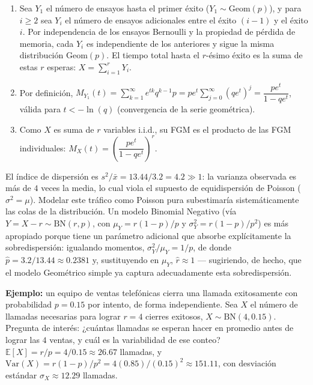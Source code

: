 \begin{solproblema}[prob:a4a72f3]
	\begin{enumerate}
		\item Sea $Y_1$ el número de ensayos hasta el primer éxito ($Y_1\sim\text{Geom}(p)$), y para $i\ge2$ sea $Y_i$ el número de ensayos adicionales entre el éxito $(i-1)$ y el éxito $i$. Por independencia de los ensayos Bernoulli y la propiedad de pérdida de memoria, cada $Y_i$ es independiente de los anteriores y sigue la misma distribución $\text{Geom}(p)$. El tiempo total hasta el $r$-ésimo éxito es la suma de estas $r$ esperas: $X = \sum_{i=1}^r Y_i$.
		\item Por definición, $M_{Y_1}(t) = \sum_{k=1}^\infty e^{tk}q^{k-1}p = pe^t\sum_{j=0}^\infty (qe^t)^j = \dfrac{pe^t}{1-qe^t}$, válida para $t < -\ln(q)$ (convergencia de la serie geométrica).
		\item Como $X$ es suma de $r$ variables i.i.d., su FGM es el producto de las FGM individuales: $M_X(t) = \left(\dfrac{pe^t}{1-qe^t}\right)^r$.
	\end{enumerate}
\end{solproblema}

\begin{solproblema}[prob:ca5c4c8]
	El índice de dispersión es $s^2/\bar{x} = 13.44/3.2 = 4.2 \gg 1$: la varianza observada es más de $4$ veces la media, lo cual viola el supuesto de equidispersión de Poisson ($\sigma^2=\mu$). Modelar este tráfico como Poisson pura subestimaría sistemáticamente las colas de la distribución. Un modelo Binomial Negativo (vía $Y=X-r\sim\text{BN}(r,p)$, con $\mu_Y=r(1-p)/p$ y $\sigma_Y^2=r(1-p)/p^2$) es más apropiado porque tiene un parámetro adicional que absorbe explícitamente la sobredispersión: igualando momentos, $\sigma_Y^2/\mu_Y = 1/p$, de donde $\hat p = 3.2/13.44 \approx 0.2381$ y, sustituyendo en $\mu_Y$, $\hat r \approx 1$ — sugiriendo, de hecho, que el modelo Geométrico simple ya captura adecuadamente esta sobredispersión.
\end{solproblema}

\begin{solproblema}[prob:4c2c37d]
	\textbf{Ejemplo:} un equipo de ventas telefónicas cierra una llamada exitosamente con probabilidad $p=0.15$ por intento, de forma independiente. Sea $X$ el número de llamadas necesarias para lograr $r=4$ cierres exitosos, $X\sim\text{BN}(4, 0.15)$. Pregunta de interés: ¿cuántas llamadas se esperan hacer en promedio antes de lograr las $4$ ventas, y cuál es la variabilidad de ese conteo? $\mathbb{E}[X] = r/p = 4/0.15 \approx 26.67$ llamadas, y $\text{Var}(X) = r(1-p)/p^2 = 4(0.85)/(0.15)^2 \approx 151.11$, con desviación estándar $\sigma_X \approx 12.29$ llamadas.
\end{solproblema}
